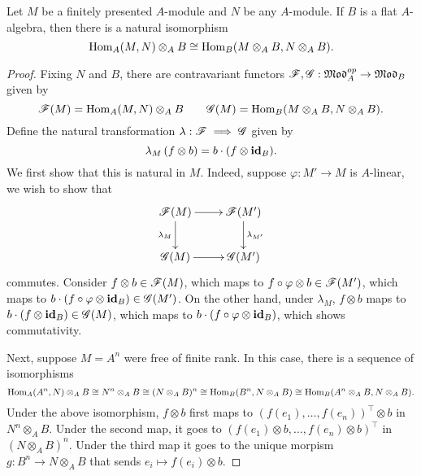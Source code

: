 \begin{theorem}
    Let $M$ be a finitely presented $A$-module and $N$ be any $A$-module. If $B$ is a flat $A$-algebra, then there is a natural isomorphism 
    \begin{equation*}
        \operatorname{Hom}_A(M, N)\otimes_A B\cong \operatorname{Hom}_B(M\otimes_A B, N\otimes_A B).
    \end{equation*}
\end{theorem}
\begin{proof}
    Fixing $N$ and $B$, there are contravariant functors $\mathscr F,\mathscr{G}:\mathfrak{Mod}_A^{op}\to\mathfrak{Mod}_B$ given by 
    \begin{equation*}
        \mathscr F(M) = \operatorname{Hom}_A(M, N)\otimes_A B\qquad\mathscr{G}(M) = \operatorname{Hom}_B(M\otimes_A B, N\otimes_A B).
    \end{equation*}
    Define the natural transformation $\lambda:\mathscr F\implies\mathscr{G}$ given by 
    \begin{equation*}
        \lambda_M\left(f\otimes b\right) = b\cdot(f\otimes\mathbf{id}_B).
    \end{equation*}
    We first show that this is natural in $M$. Indeed, suppose $\varphi: M'\to M$ is $A$-linear, we wish to show that 
    \begin{equation*}
        \xymatrix {
            \scrF(M)\ar[r]\ar[d]_{\lambda_M} & \scrF(M')\ar[d]^{\lambda_{M'}}\\
            \scrG(M)\ar[r] & \scrG(M')
        }
    \end{equation*}
    commutes. Consider $f\otimes b\in\mathscr F(M)$, which maps to $f\circ\varphi\otimes b\in\mathscr F(M')$, which maps to $b\cdot(f\circ\varphi\otimes\mathbf{id}_B)\in\mathscr{G}(M')$. On the other hand, under $\lambda_M$, $f\otimes b$ maps to $b\cdot(f\otimes\mathbf{id}_B)\in\mathscr{G}(M)$, which maps to $b\cdot(f\circ\varphi\otimes\mathbf{id}_B)$, which shows commutativity.

    Next, suppose $M = A^n$ were free of finite rank. In this case, there is a sequence of isomorphisms
    \begin{equation*}
        \operatorname{Hom}_A(A^n, N)\otimes_A B\cong N^n\otimes_A B\cong(N\otimes_A B)^n\cong\operatorname{Hom}_B(B^n, N\otimes_A B)\cong\operatorname{Hom}_B(A^n\otimes_A B, N\otimes_A B).
    \end{equation*}
    Under the above isomorphism, $f\otimes b$ first maps to $(f(e_1),\dots,f(e_n))^\top\otimes b$ in $N^n\otimes_A B$. Under the second map, it goes to $(f(e_1)\otimes b,\dots,f(e_n)\otimes b)^\top$ in $(N\otimes_A B)^n$. Under the third map it goes to the unique morpism $g: B^n\to N\otimes_A B$ that sends $e_i\mapsto f(e_i)\otimes b$. 


\end{proof}
